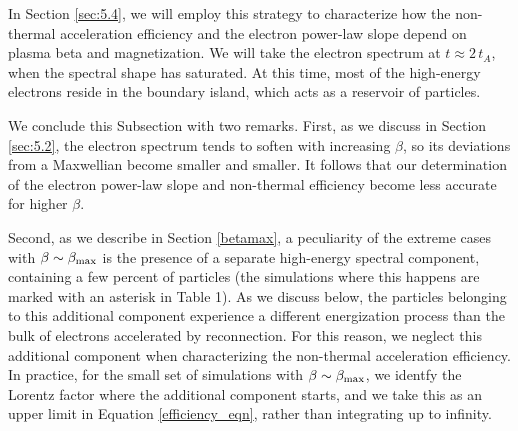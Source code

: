 In Section \ref{sec:5.4}, we will employ this strategy to characterize how the non-thermal acceleration efficiency and the electron power-law slope depend on plasma beta and magnetization. We will take the electron spectrum at $t\approx 2\,t_{A}$, when the spectral shape has saturated. At this time, most of the high-energy electrons reside in the boundary island, which acts as a reservoir of particles. 

We conclude this Subsection with two remarks. First, as we discuss in Section \ref{sec:5.2}, the electron spectrum tends to soften with increasing $\beta$, so its deviations from a Maxwellian  become smaller and smaller. It follows that our determination of the electron power-law slope and non-thermal efficiency become less accurate for higher $\beta$. 

Second, as we describe in Section \ref{betamax}, a peculiarity of the extreme cases with $\beta\sim \beta_{\rm max}$ is the presence of a separate high-energy spectral component, containing a few percent of particles (the simulations where this happens are marked with an asterisk in Table 1). As we discuss below, the particles belonging to this additional component experience a different energization process than the bulk of electrons accelerated by reconnection. For this reason, we neglect this additional component when characterizing the non-thermal acceleration efficiency. In practice, for the small set of simulations with $\beta\sim \beta_{\rm max}$, we identfy the Lorentz factor where the additional component starts, and we take this as an upper limit in Equation \ref{efficiency_eqn}, rather than integrating up to infinity. 
  

